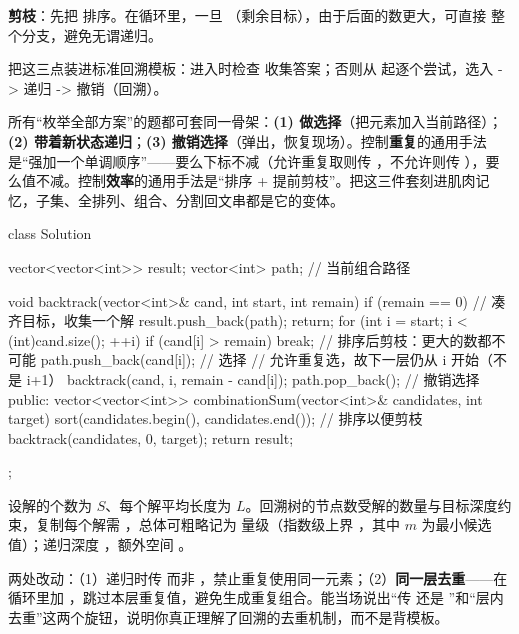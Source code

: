 \textbf{剪枝}：先把  排序。在循环里，一旦 （剩余目标），由于后面的数更大，可直接  整个分支，避免无谓递归。

把这三点装进标准回溯模板：进入时检查  收集答案；否则从  起逐个尝试，选入 -> 递归 -> 撤销（回溯）。

\begin{idea}[回溯三件套：选择、约束、撤销]
所有“枚举全部方案”的题都可套同一骨架：\textbf{(1) 做选择}（把元素加入当前路径）；\textbf{(2) 带着新状态递归}；\textbf{(3) 撤销选择}（弹出，恢复现场）。控制\textbf{重复}的通用手法是“强加一个单调顺序”——要么下标不减（允许重复取则传 ，不允许则传 ），要么值不减。控制\textbf{效率}的通用手法是“排序 + 提前剪枝”。把这三件套刻进肌肉记忆，子集、全排列、组合、分割回文串都是它的变体。
\end{idea}

\begin{cpp}
class Solution {
    vector<vector<int>> result;
    vector<int> path;                 // 当前组合路径

    void backtrack(vector<int>& cand, int start, int remain) {
        if (remain == 0) {            // 凑齐目标，收集一个解
            result.push_back(path);
            return;
        }
        for (int i = start; i < (int)cand.size(); ++i) {
            if (cand[i] > remain) break;   // 排序后剪枝：更大的数都不可能
            path.push_back(cand[i]);       // 选择
            // 允许重复选，故下一层仍从 i 开始（不是 i+1）
            backtrack(cand, i, remain - cand[i]);
            path.pop_back();               // 撤销选择
        }
    }
public:
    vector<vector<int>> combinationSum(vector<int>& candidates, int target) {
        sort(candidates.begin(), candidates.end()); // 排序以便剪枝
        backtrack(candidates, 0, target);
        return result;
    }
};
\end{cpp}

\begin{keypoint}[复杂度]
设解的个数为 $S$、每个解平均长度为 $L$。回溯树的节点数受解的数量与目标深度约束，复制每个解需 ，总体可粗略记为  量级（指数级上界 ，其中 $m$ 为最小候选值）；递归深度 ，额外空间 。
\end{keypoint}

\begin{followup}
两处改动：（1）递归时传  而非 ，禁止重复使用同一元素；（2）\textbf{同一层去重}——在  循环里加 ，跳过本层重复值，避免生成重复组合。能当场说出“传  还是 ”和“层内去重”这两个旋钮，说明你真正理解了回溯的去重机制，而不是背模板。
\end{followup}

